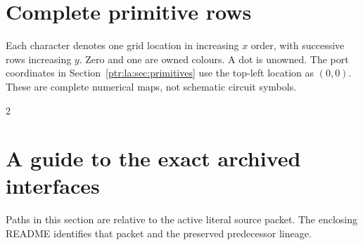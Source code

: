 \documentclass[11pt,letterpaper]{article}
\makeatletter
\theoremstyle{definition}\newtheorem{definition}[theorem]{Definition}
\theoremstyle{remark}\newtheorem{remark}[theorem]{Remark}
\newcommand{\ptrR}{}
\newcommand{\ptrappendix}{%
  \setcounter{section}{0}\def\Hy@chapapp{appendix}%
  \renewcommand{\thesection}{\ptrR.\Alph{section}}%
  \renewcommand{\theHsection}{\ptrR.\Alph{section}}}
\makeatother
\begin{document}
\ptrappendix
\clearpage
\section{Complete primitive rows}\label{ptr:la:app:maps}
Each character denotes one grid location in increasing $x$ order, with successive rows increasing $y$. Zero and one are owned colours. A dot is unowned. The port coordinates in Section~\ref{ptr:la:sec:primitives} use the top-left location as $(0,0)$. These are complete numerical maps, not schematic circuit symbols.
\begin{multicols}{2}

\end{multicols}

\section{A guide to the exact archived interfaces}\label{ptr:la:app:guide}
Paths in this section are relative to the active literal source packet. The enclosing README identifies that packet and the preserved predecessor lineage.
\end{document}
